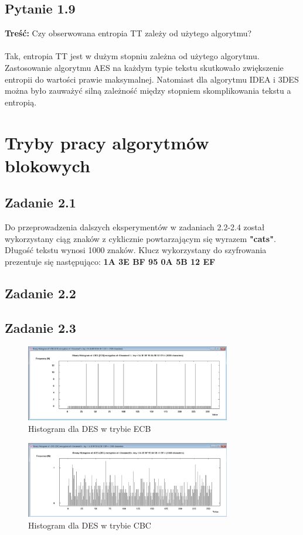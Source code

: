 \documentclass{article}
\begin{document}
\subsection{Pytanie 1.9}
    \textbf{Treść:} Czy obserwowana entropia TT zależy od użytego algorytmu?    \\\\
    Tak, entropia TT jest w dużym stopniu zależna od użytego algorytmu. Zastosowanie algorytmu AES na każdym typie tekstu skutkowało zwiększenie
    entropii do wartości prawie maksymalnej. Natomiast dla algorytmu IDEA i 3DES można było zauważyć silną zależność między
    stopniem skomplikowania tekstu a entropią.



\section{Tryby pracy algorytmów blokowych}
\subsection{Zadanie 2.1}
Do przeprowadzenia dalszych eksperymentów w zadaniach 2.2-2.4 został wykorzystany ciąg znaków z cyklicznie powtarzającym się wyrazem \textbf{"cats"}. Długość tekstu wynosi 1000 znaków. Klucz wykorzystany do szyfrowania prezentuje się następująco: \textbf{1A 3E BF 95 0A 5B 12 EF}


\subsection{Zadanie 2.2}
\subsection{Zadanie 2.3}
\begin{figure}[H]
    \centering
    \includegraphics[width=0.8\textwidth]{cat_des_ecb_histogram.png}
    \caption{Histogram dla DES w trybie ECB}
\end{figure}

\begin{figure}[H]
    \centering
    \includegraphics[width=0.8\textwidth]{cat_des_cbc_histogram.png}
    \caption{Histogram dla DES w trybie CBC}
\end{figure}
\end{document}
